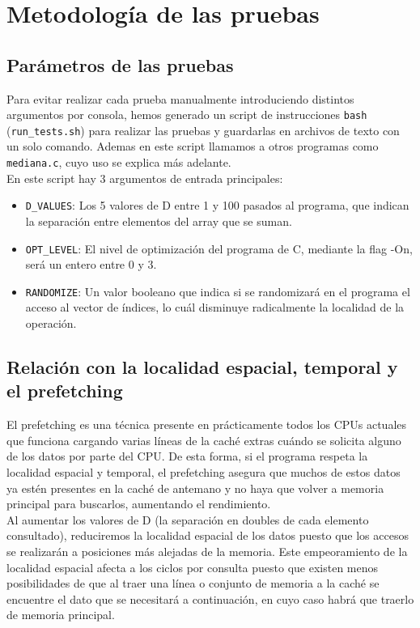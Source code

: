 \documentclass[a4paper,twocolumn]{article}
\begin{document}
	\section{Metodología de las pruebas}
	\subsection{Parámetros de las pruebas}
	Para evitar realizar cada prueba manualmente introduciendo distintos argumentos por consola, hemos generado un script de instrucciones \texttt{bash} (\texttt{run\_tests.sh}) para realizar las pruebas y guardarlas en archivos de texto con un solo comando. Ademas en este script llamamos a otros programas como \texttt{mediana.c}, cuyo uso se explica más adelante. \\
	
    En este script hay 3 argumentos de entrada principales: \\
    \begin{itemize}
        \item \texttt{D\_VALUES}: Los 5 valores de D entre 1 y 100 pasados al programa, que indican la separación entre elementos del array que se suman.
        \item \texttt{OPT\_LEVEL}: El nivel de optimización del programa de C, mediante la flag -On, será un entero entre 0 y 3.
        \item \texttt{RANDOMIZE}: Un valor booleano que indica si se randomizará en el programa el acceso al vector de índices, lo cuál disminuye radicalmente la localidad de la operación.
    \end{itemize}
    
    \subsection{Relación con la localidad espacial, temporal y el prefetching}
    \label{cache}
    El prefetching \cite{wikiprefetch} es una técnica presente en prácticamente todos los CPUs actuales que funciona cargando varias líneas de la caché extras cuándo se solicita alguno de los datos por parte del CPU. De esta forma, si el programa respeta la localidad espacial y temporal, el prefetching asegura que muchos de estos datos ya estén presentes en la caché de antemano y no haya que volver a memoria principal para buscarlos, aumentando el rendimiento. \\
    
    Al aumentar los valores de D (la separación en doubles de cada elemento consultado), reduciremos la localidad espacial de los datos puesto que los accesos se realizarán a posiciones más alejadas de la memoria. Este empeoramiento de la localidad espacial afecta a los ciclos por consulta puesto que existen menos posibilidades de que al traer una línea o conjunto de memoria a la caché se encuentre el dato que se necesitará a continuación, en cuyo caso habrá que traerlo de memoria principal. \\
    
\end{document}
